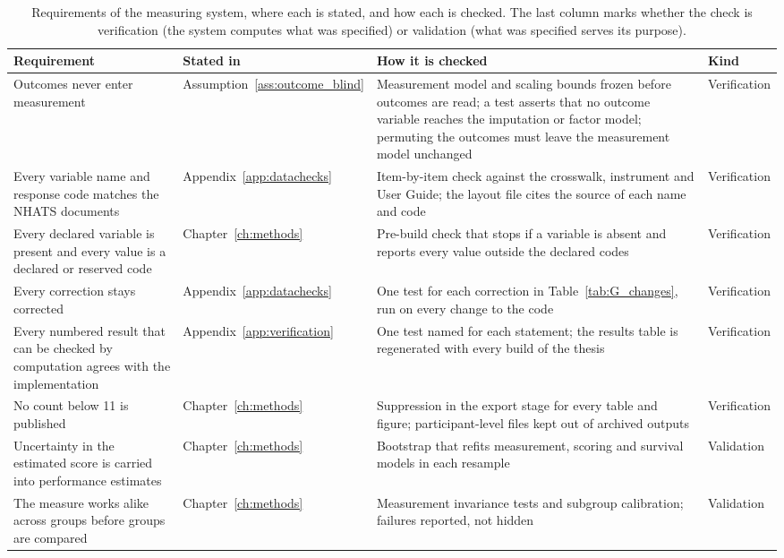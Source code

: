 \begin{table}[htbp]
\centering
\caption{Requirements of the measuring system, where each is stated, and how
each is checked. The last column marks whether the check is verification
(the system computes what was specified) or validation (what was specified
serves its purpose).}
\label{tab:sys-requirements}
\footnotesize
\renewcommand{\arraystretch}{1.2}
\begin{tabular}{p{4.0cm} p{2.4cm} p{5.6cm} p{1.4cm}}
\toprule
\textbf{Requirement} & \textbf{Stated in} & \textbf{How it is checked} & \textbf{Kind} \\
\midrule
Outcomes never enter measurement & Assumption~\ref{ass:outcome_blind} & Measurement model and scaling bounds frozen before outcomes are read; a test asserts that no outcome variable reaches the imputation or factor model; permuting the outcomes must leave the measurement model unchanged & Verification \\
\addlinespace
Every variable name and response code matches the NHATS documents & Appendix~\ref{app:datachecks} & Item-by-item check against the crosswalk, instrument and User Guide; the layout file cites the source of each name and code & Verification \\
\addlinespace
Every declared variable is present and every value is a declared or reserved code & Chapter~\ref{ch:methods} & Pre-build check that stops if a variable is absent and reports every value outside the declared codes & Verification \\
\addlinespace
Every correction stays corrected & Appendix~\ref{app:datachecks} & One test for each correction in Table~\ref{tab:G_changes}, run on every change to the code & Verification \\
\addlinespace
Every numbered result that can be checked by computation agrees with the implementation & Appendix~\ref{app:verification} & One test named for each statement; the results table is regenerated with every build of the thesis & Verification \\
\addlinespace
No count below 11 is published & Chapter~\ref{ch:methods} & Suppression in the export stage for every table and figure; participant-level files kept out of archived outputs & Verification \\
\addlinespace
Uncertainty in the estimated score is carried into performance estimates & Chapter~\ref{ch:methods} & Bootstrap that refits measurement, scoring and survival models in each resample & Validation \\
\addlinespace
The measure works alike across groups before groups are compared & Chapter~\ref{ch:methods} & Measurement invariance tests and subgroup calibration; failures reported, not hidden & Validation \\
\bottomrule
\end{tabular}
\end{table}

